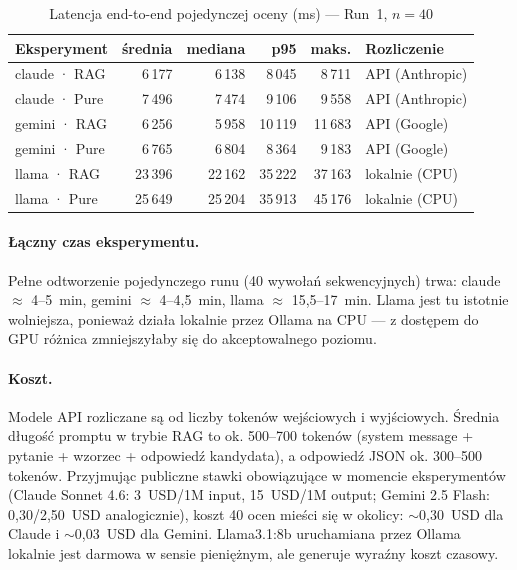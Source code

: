 \documentclass[12pt, a4paper]{article}
\begin{document}
\begin{table}[H]
    \centering
    \caption{Latencja end-to-end pojedynczej oceny (ms) — Run~1, $n=40$}
    \label{tab:latency}
    \begin{tabular}{@{}lrrrrl@{}}
        \toprule
        \textbf{Eksperyment}
            & \textbf{średnia} & \textbf{mediana}
            & \textbf{p95}     & \textbf{maks.}
            & \textbf{Rozliczenie} \\
        \midrule
        claude · RAG    &  6\,177 &  6\,138 &  8\,045 &  8\,711 & API (Anthropic) \\
        claude · Pure   &  7\,496 &  7\,474 &  9\,106 &  9\,558 & API (Anthropic) \\
        gemini · RAG    &  6\,256 &  5\,958 & 10\,119 & 11\,683 & API (Google)    \\
        gemini · Pure   &  6\,765 &  6\,804 &  8\,364 &  9\,183 & API (Google)    \\
        llama · RAG     & 23\,396 & 22\,162 & 35\,222 & 37\,163 & lokalnie (CPU)  \\
        llama · Pure    & 25\,649 & 25\,204 & 35\,913 & 45\,176 & lokalnie (CPU)  \\
        \bottomrule
    \end{tabular}
\end{table}

\paragraph{Łączny czas eksperymentu.}
Pełne odtworzenie pojedynczego runu (40 wywołań sekwencyjnych)
trwa: claude $\approx$ 4--5~min, gemini $\approx$ 4--4,5~min,
llama $\approx$ 15,5--17~min. Llama jest tu istotnie wolniejsza,
ponieważ działa lokalnie przez Ollama na CPU — z dostępem do GPU
różnica zmniejszyłaby się do akceptowalnego poziomu.

\paragraph{Koszt.}
Modele API rozliczane są od liczby tokenów wejściowych i wyjściowych.
Średnia długość promptu w trybie RAG to ok. 500--700 tokenów (system message
+ pytanie + wzorzec + odpowiedź kandydata), a odpowiedź JSON ok. 300--500
tokenów. Przyjmując publiczne stawki obowiązujące w momencie eksperymentów
(Claude Sonnet 4.6: 3~USD/1M input, 15~USD/1M output; Gemini 2.5 Flash:
0{,}30/2{,}50~USD analogicznie), koszt 40 ocen mieści się w okolicy:
$\sim$0,30~USD dla Claude i $\sim$0,03~USD dla Gemini.
Llama3.1:8b uruchamiana przez Ollama lokalnie jest darmowa
w sensie pieniężnym, ale generuje wyraźny koszt czasowy.
\end{document}
